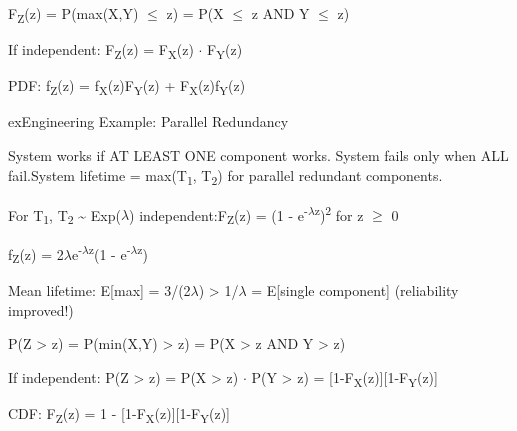 

F\textsubscript{Z}(z) = P(max(X,Y) \ensuremath{\le} z) = P(X \ensuremath{\le} z AND Y \ensuremath{\le} z)

If independent: F\textsubscript{Z}(z) = F\textsubscript{X}(z) \ensuremath{\cdot} F\textsubscript{Y}(z)

PDF: f\textsubscript{Z}(z) = f\textsubscript{X}(z)F\textsubscript{Y}(z) + F\textsubscript{X}(z)f\textsubscript{Y}(z)

\begin{PSbox}[unbreakable]{ex}{Engineering Example: Parallel Redundancy}

System works if AT LEAST ONE component works. System fails only when ALL fail.\PSbr{}System lifetime = max(T\textsubscript{1}, T\textsubscript{2}) for parallel redundant components.

For T\textsubscript{1}, T\textsubscript{2} \textasciitilde{} Exp(\ensuremath{\lambda}) independent:\PSbr{}F\textsubscript{Z}(z) = (1 - e\textsuperscript{-\ensuremath{\lambda}z})\textsuperscript{2} for z \ensuremath{\ge} 0

f\textsubscript{Z}(z) = 2\ensuremath{\lambda}e\textsuperscript{-\ensuremath{\lambda}z}(1 - e\textsuperscript{-\ensuremath{\lambda}z})

Mean lifetime: E[max] = 3/(2\ensuremath{\lambda}) \textgreater{} 1/\ensuremath{\lambda} = E[single component] (reliability improved!)

\end{PSbox}



P(Z \textgreater{} z) = P(min(X,Y) \textgreater{} z) = P(X \textgreater{} z AND Y \textgreater{} z)

If independent: P(Z \textgreater{} z) = P(X \textgreater{} z) \ensuremath{\cdot} P(Y \textgreater{} z) = [1-F\textsubscript{X}(z)][1-F\textsubscript{Y}(z)]

CDF: F\textsubscript{Z}(z) = 1 - [1-F\textsubscript{X}(z)][1-F\textsubscript{Y}(z)]


